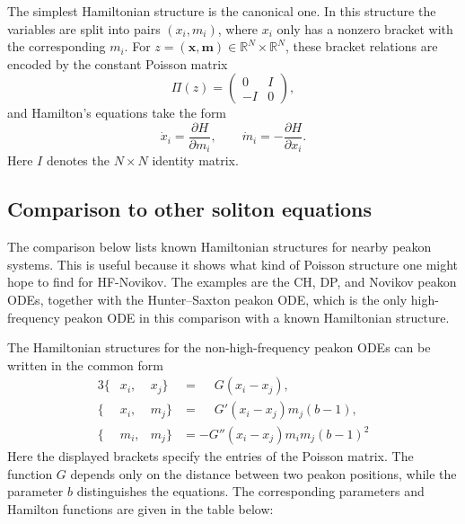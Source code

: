 \documentclass[english,master]{liumaiex}
\theoremstyle{thesisplain}
\theoremstyle{thesisdefinition}
\numberwithin{equation}{section}
\begin{document}
The simplest Hamiltonian structure is the canonical one. In this structure the variables are split into pairs $(x_i,m_i)$, where $x_i$ only has a nonzero bracket with the corresponding $m_i$. For $z=(\boldsymbol{x},\boldsymbol{m}) \in \mathbb{R}^N \times \mathbb{R}^N$, these bracket relations are encoded by the constant Poisson matrix
\begin{equation}
	\Pi(z) =
	\begin{pmatrix}
		0 & I \\
		-I & 0
	\end{pmatrix},
\end{equation}
and Hamilton's equations take the form
\begin{equation}
	\dot{x}_i = \frac{\partial H}{\partial m_i},
	\qquad
	\dot{m}_i = -\frac{\partial H}{\partial x_i}.
\end{equation}
Here $I$ denotes the $N\times N$ identity matrix.

\subsection{Comparison to other soliton equations}

The comparison below lists known Hamiltonian structures for nearby peakon systems. This is useful because it shows what kind of Poisson structure one might hope to find for HF-Novikov. The examples are the CH, DP, and Novikov peakon ODEs, together with the Hunter--Saxton peakon ODE, which is the only high-frequency peakon ODE in this comparison with a known Hamiltonian structure.

The Hamiltonian structures for the non-high-frequency peakon ODEs can be written in the common form \cite{Degasperis_2002, Hone_2008}
\begin{alignat}{3}
	\{&x_i, &x_j\} &= \phantom{-}G(x_i - x_j), \\
	\{&x_i, &m_j\} &= \phantom{-}G'(x_i - x_j)m_j (b - 1), \\
	\{&m_i, &m_j\} &=           -G''(x_i - x_j) m_i m_j (b - 1)^2
\end{alignat}
%
Here the displayed brackets specify the entries of the Poisson matrix. The function $G$ depends only on the distance between two peakon positions, while the parameter $b$ distinguishes the equations. The corresponding parameters and Hamilton functions are given in the table below:
\end{document}
